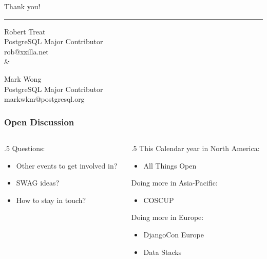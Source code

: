 \frame
{
  \begin{center}
    \Huge Thank you!\\

    \rule{0.9\textwidth}{1pt}

    \large
    Robert Treat\\
    PostgreSQL Major Contributor\\
    rob@xzilla.net\\

    \&

    Mark Wong\\
    PostgreSQL Major Contributor\\
    markwkm@postgresql.org
  \end{center}

}

\frame
{
  \frametitle{Open Discussion}

  \begin{columns}
    \begin{column}[T]{.5\textwidth}
      Questions:
      \begin{itemize}
        \item Other events to get involved in?
        \item SWAG ideas?
        \item How to stay in touch?
      \end{itemize}
    \end{column}
    \begin{column}[T]{.5\textwidth}
      This Calendar year in North America:

      \begin{itemize}
        \item All Things Open
      \end{itemize}

      Doing more in Asia-Pacific:
      \begin{itemize}
        \item COSCUP
      \end{itemize}

      Doing more in Europe:
      \begin{itemize}
        \item DjangoCon Europe
        \item Data Stacks
      \end{itemize}
    \end{column}
  \end{columns}
}


